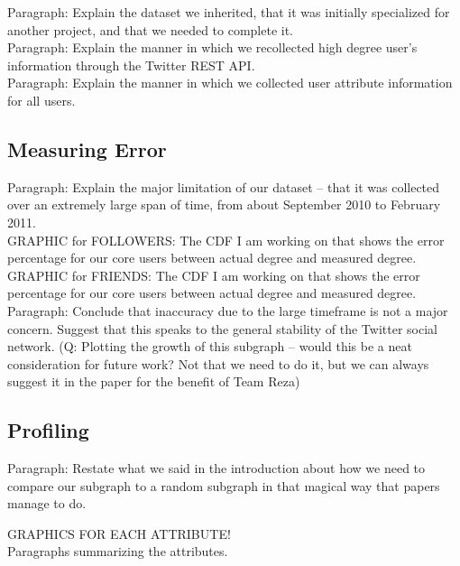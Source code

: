 Paragraph: Explain the dataset we inherited, that it was initially specialized for another project, and that we needed to complete it.\\

Paragraph: Explain the manner in which we recollected high degree user's information through the Twitter REST API.\\

Paragraph: Explain the manner in which we collected user attribute information for all users.\\

\subsection{Measuring Error}

Paragraph: Explain the major limitation of our dataset -- that it was collected over an extremely large span of time, from about September 2010 to February 2011.\\

GRAPHIC for FOLLOWERS: The CDF I am working on that shows the error percentage for our core users between actual degree and measured degree.\\

GRAPHIC for FRIENDS: The CDF I am working on that shows the error percentage for our core users between actual degree and measured degree.\\

Paragraph: Conclude that inaccuracy due to the large timeframe is not a major concern.  Suggest that this speaks to the general stability of the Twitter social network.  (Q: Plotting the growth of this subgraph -- would this be a neat consideration for future work?  Not that we need to do it, but we can always suggest it in the paper for the benefit of Team Reza)\\

\subsection{Profiling}

Paragraph: Restate what we said in the introduction about how we need to compare our subgraph to a random subgraph in that magical way that papers manage to do.

GRAPHICS FOR EACH ATTRIBUTE!\\

Paragraphs summarizing the attributes.\\

